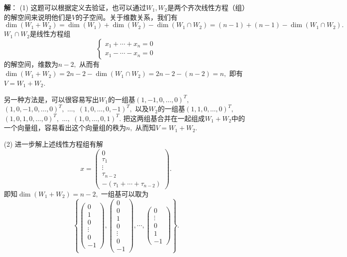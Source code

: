 \newpageorvspace

{\bf 解}： (1) 这题可以根据定义去验证，也可以通过$W_1, W_2$是两个齐次线性方程（组）的解空间来说明他们是$V$的子空间。关于维数关系，我们有
$$\dim (W_1 + W_2) = \dim(W_1) + \dim(W_2) - \dim(W_1 \cap W_2) = (n - 1) + (n - 1) - \dim(W_1 \cap W_2).$$
$W_1 \cap W_2$是线性方程组
$$
\begin{cases}
x_1 + \cdots + x_n = 0 \\
x_1 - \cdots - x_n = 0
\end{cases}
$$
的解空间，维数为$n-2,$ 从而有$\dim (W_1 + W_2) = 2n - 2 - \dim(W_1 \cap W_2) = 2n - 2 - (n - 2) = n,$ 即有$V = W_1 + W_2$.

另一种方法是，可以很容易写出$W_1$的一组基$(1, -1, 0, \ldots, 0)^T,$ $(1, 0, -1, 0, \ldots, 0)^T,$ $\ldots,$ $(1, 0, \ldots, 0, -1)^T,$ 以及$W_2$的一组基$(1, 1, 0, \ldots, 0)^T,$ $(1, 0, 1, 0, \ldots, 0)^T,$ $\ldots,$ $(1, 0, \ldots, 0, 1)^T.$ 把这两组基合并在一起组成$W_1 + W_2$中的一个向量组，容易看出这个向量组的秩为$n,$ 从而知$V = W_1 + W_2.$

(2) 进一步解上述线性方程组有解
$$x = \begin{pmatrix} 0 \\ \tau_1 \\ \vdots \\ \tau_{n-2} \\ -(\tau_1 + \cdots + \tau_{n-2}) \end{pmatrix}.$$
即知$\dim (W_1 + W_2) = n - 2,$ 一组基可以取为
$$\left\{ \begin{pmatrix} 0 \\ 1 \\ 0 \\ \vdots \\ 0 \\ -1 \end{pmatrix}, \begin{pmatrix} 0 \\ 0 \\ 1 \\ 0 \\ \vdots \\ 0 \\ -1 \end{pmatrix}, \cdots, \begin{pmatrix} 0 \\ \vdots \\ 0 \\ 1 \\ -1 \end{pmatrix} \right\}.$$


